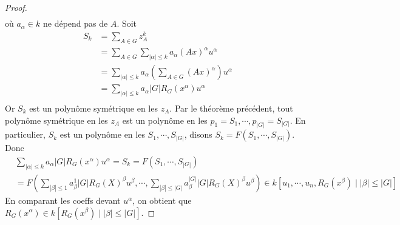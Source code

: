 \begin{proof}
\begin{align*}
            \end{align*}
            où $a_\alpha \in k$ ne dépend pas de $A$. Soit
            \begin{align*}
                S_k &= \sum_{A \in G} z_A^k \\
                &= \sum_{A \in G} \sum_{|\alpha| \leq k} a_\alpha (Ax)^\alpha u^\alpha \\
                &= \sum_{|\alpha| \leq k} a_\alpha \left( \sum_{A \in G} (Ax)^\alpha \right) u^\alpha \\
                &= \sum_{|\alpha| \leq k} a_\alpha |G|R_G(x^\alpha) u^\alpha \\
            \end{align*}
            Or $S_k$ est un polynôme symétrique en les $z_A$. Par le théorème précédent, tout polynôme symétrique en les $z_A$ est un polynôme en les $p_1 = S_1, \cdots, p_{|G|} = S_{|G|}$. En particulier, $S_k$ est un polynôme en les $S_1, \cdots, S_{|G|}$, disons $S_k = F(S_1, \cdots, S_{|G|})$. Donc 
            \begin{align*}
                &\sum_{|\alpha| \leq k} a_\alpha |G|R_G(x^\alpha) u^\alpha = S_k = F(S_1, \cdots, S_{|G|}) \\
                &= F\left(\sum_{|\beta| \leq 1} a^1_\beta |G|R_G(X)^\beta u^\beta, \cdots, \sum_{|\beta| \leq |G|} a^{|G|}_\beta |G|R_G(X)^\beta u^\beta \right) \in k[u_1, \cdots, u_n, R_G(x^\beta) \mid |\beta| \leq |G|]
            \end{align*}
            En comparant les coeffs devant $u^\alpha$, on obtient que $R_G(x^\alpha) \in k[R_G(x^\beta) \mid |\beta| \leq |G|]$.
        \end{proof}
        
